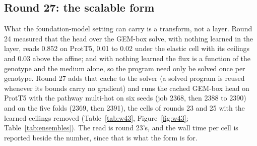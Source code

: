 \subsection{Round 27: the scalable form}
\label{sec:round27}

What the foundation-model setting can carry is a transform, not a layer. Round 24
measured that the head over the GEM-box solve, with nothing learned in the layer,
reads 0.852 on ProtT5, 0.01 to 0.02 under the elastic cell with its ceilings and 0.03
above the affine; and with nothing learned the flux is a function of the genotype and
the medium alone, so the program need only be solved once per genotype. Round 27 adds
that cache to the solver (a solved program is reused whenever its bounds carry no
gradient) and runs the cached GEM-box head on ProtT5 with the pathway multi-hot on six
seeds (job 2368, then 2388 to 2390) and on the five folds (2369, then 2391), the cells
of rounds 23 and 25 with the learned ceilings removed (Table~\ref{tab:w43},
Figure~\ref{fig:w43};
Table~\ref{tab:ensembles}). The read is round 23's, and the wall time per cell is
reported beside the number, since that is what the form is for.




